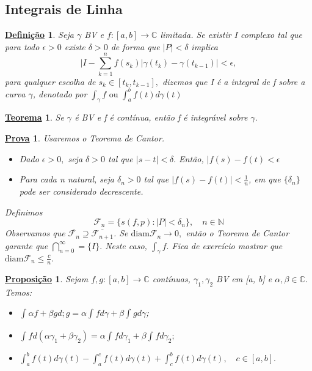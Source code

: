 \documentclass{article}
\newtheorem*{def*}{\underline{Defini\c c\~ao}}
\newtheorem*{theorem*}{\underline{Teorema}}
\newtheorem*{proof*}{\underline{Prova}}
\newtheorem*{prop*}{\underline{Proposi\c c\~ao}}
\begin{document}
  \subsection{Integrais de Linha}
  \begin{def*}
    Seja $\gamma$ BV e $f:[a, b]\rightarrow \mathbb{C}$ limitada. Se existir I complexo tal que para todo $\epsilon > 0$ existe $\delta > 0$
    de forma que $|P| < \delta$ implica
    $$
    \biggl|I - \sum\limits_{k=1}^{n}f(s_{k})|\gamma(t_{k}) - \gamma(t_{k-1})\biggr| < \epsilon,
    $$
    para qualquer escolha de $s_{k}\in{[t_{k}, t_{k-1}]},$ dizemos que I \'e a integral de f sobre a curva $\gamma$, denotado por
    $\int_{\gamma}^{}f\text{ ou } \int_{a}^{b}f(t)d\gamma(t)$
  \end{def*}
  \begin{theorem*}
    Se $\gamma$ \'e BV e f \'e cont\'inua, ent\~ao f \'e integr\'avel sobre $\gamma.$
  \end{theorem*}
  \begin{proof*}
    Usaremos o Teorema de Cantor.
    \begin{itemize}
      \item[1)] Dado $\epsilon > 0,$ seja $\delta > 0$ tal que $|s-t| < \delta.$ Ent\~ao, $|f(s) - f(t) < \epsilon$
      \item[2)] Para cada n natural, seja $\delta_{n} > 0$ tal que $|f(s) - f(t)| < \frac{1}{n}$, em que $\{\delta_{n}\}$ pode ser 
        considerado decrescente. 
    \end{itemize}

    Definimos 
    $$
    \mathcal{F}_{n} = \{s(f, p): |P| < \delta_{n}\}, \quad n\in \mathbb{N}
    $$
    Observamos que  $\overline{\mathcal{F}_{n}}\supseteq\overline{\mathcal{F}_{n+1}}$. Se $\mathrm{diam} \mathcal{F}_{n}\to{0},$ ent\~ao
    o Teorema de Cantor garante que $\bigcap_{n=0}^{\infty} = \{I\}.$ Neste caso, $\int_{\gamma}^{}f.$ Fica de exerc\'icio mostrar que
    $\mathrm{diam} \mathcal{F}_{n}\leq \frac{c}{n}.$
  \end{proof*}
  \begin{prop*}
    Sejam $f, g:[a, b]\rightarrow \mathbb{C}$ cont\'inuas, $\gamma_{1}, \gamma_2$ BV em [a, b] e $\alpha, \beta\in{\mathbb{C}}.$
    Temos: 
    \begin{itemize}
      \item[i)] $\int_{}^{}\alpha f + \beta g d;g = \alpha \int_{}^{}fd \gamma + \beta \int_{}^{}gd \gamma$;
      \item[ii)] $\int_{}^{}f d(\alpha \gamma_1 + \beta \gamma_2) = \alpha\int_{}^{}f d \gamma_1 + \beta \int_{}^{}f d \gamma_2;$
      \item[iii)] $\int_{a}^{b}f(t)d \gamma(t) - \int_{a}^{c}f(t)d \gamma(t) + \int_{c}^{b}f(t) d \gamma(t), \quad c\in{[a, b]}.$
    \end{itemize}
  \end{prop*}
\end{document}
